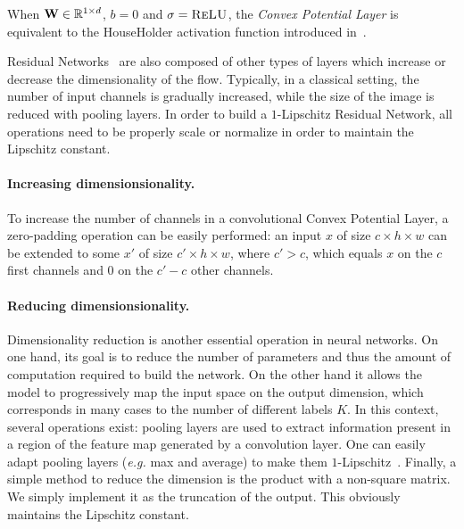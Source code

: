\begin{rmq}
When $\mathbf{W}\in\mathbb{R}^{1\times d}$, $b =0$ and $\sigma=\textsc{ReLU}$, the \emph{Convex Potential Layer} is equivalent to the HouseHolder activation function introduced in~\citet{singla2021householder}.
\end{rmq}

Residual Networks~\citep{he2016deep} are also composed of other types of layers which increase or decrease the dimensionality of the flow.
Typically, in a classical setting, the number of input channels is gradually increased, while the size of the image is reduced with pooling layers.
In order to build a $1$-Lipschitz Residual Network, all operations need to be properly scale or normalize in order to maintain the Lipschitz constant.

\paragraph{Increasing dimensionsionality.} To increase the number of channels in a convolutional Convex Potential Layer, a zero-padding operation can be easily performed: an input $x$ of size $c\times h \times w$ can be extended to some $x'$ of size  $c'\times h \times w$, where $c'>c$, which equals $x$ on the $c$ first channels and $0$ on the $c'-c$ other channels.
\paragraph{Reducing dimensionsionality.} Dimensionality reduction is another essential operation in neural networks. On one hand, its  goal is to  reduce the number of parameters and thus the amount of computation required to build the network. On the other hand it allows the model to progressively map the input space on the output dimension, which corresponds in many cases to the number of different labels $K$. 
In this context, several operations exist:
pooling layers are used to extract information present in a region of the feature map generated by a convolution layer. One can easily adapt pooling layers (\emph{e.g.} max and average) to make them $1$-Lipschitz~\citep{bartlett2017spectrally}.
Finally, a simple method to reduce the dimension is the product with a non-square matrix. We simply implement it as  the truncation of the output. This obviously maintains the Lipschitz constant.


